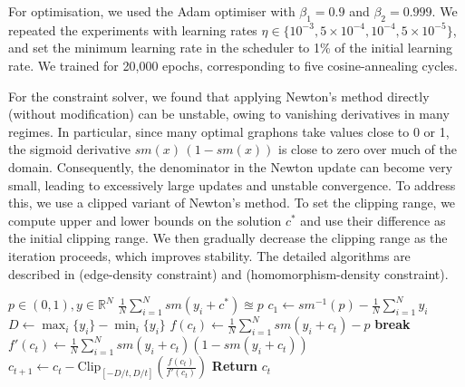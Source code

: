 \documentclass{article}
\theoremstyle{plain}
\theoremstyle{definition}
\theoremstyle{remark}
\newcommand*{\R}{\mathbb{R}}
\begin{document}
For optimisation, we used the Adam optimiser with $\beta_1=0.9$ and $\beta_2=0.999$.
We repeated the experiments with learning rates $\eta \in \{10^{-3}, 5 \times 10^{-4}, 10^{-4}, 5 \times 10^{-5}\}$, and set the minimum learning rate in the scheduler to 1\% of the initial learning rate.
We trained for 20,000 epochs, corresponding to five cosine-annealing cycles.

For the constraint solver, we found that applying Newton's method directly (without modification) can be unstable, owing to vanishing derivatives in many regimes.
In particular, since many optimal graphons take values close to 0 or 1, the sigmoid derivative $\mathit{sm}(x)\,(1-\mathit{sm}(x))$ is close to zero over much of the domain.
Consequently, the denominator in the Newton update can become very small, leading to excessively large updates and unstable convergence.
To address this, we use a clipped variant of Newton's method. To set the clipping range, we compute upper and lower bounds on the solution $c^*$ and use their difference as the initial clipping range.
We then gradually decrease the clipping range as the iteration proceeds, which improves stability.
The detailed algorithms are described in  (edge-density constraint) and  (homomorphism-density constraint).

\begin{algorithm}
  \caption{Edge-Density Constraint Solver}\label{alg:cap}
  \begin{algorithmic}
    \REQUIRE $p \in (0, 1), y \in \R^N$
    \ENSURE $\frac{1}{N} \sum_{i=1}^N \mathit{sm}(y_i + c^*) \approxeq p$
    \STATE $c_1 \gets \mathit{sm}^{-1}(p) - \frac{1}{N} \sum_{i=1}^N y_i$ \hfill {}
    \STATE $D \gets \max_i \{y_i\} - \min_i \{y_i\}$ \hfill {}
      \STATE $f(c_t) \gets \frac{1}{N} \sum_{i=1}^N \mathit{sm}(y_i + c_t) - p$ 
        \STATE \textbf{break} 
      \ENDIF 
      \STATE $f'(c_t) \gets \frac{1}{N} \sum_{i=1}^N \mathit{sm}(y_i + c_t) (1 - \mathit{sm}(y_i + c_t))$
      \STATE $c_{t+1} \gets c_t - \mathrm{Clip}_{[-D/t, D/t]}\left(\frac{f(c_t)}{f'(c_t)}\right)$ \hfill {}
    \ENDFOR
    \STATE \textbf{Return} $c_t$
  \end{algorithmic}
\end{algorithm}
\end{document}
